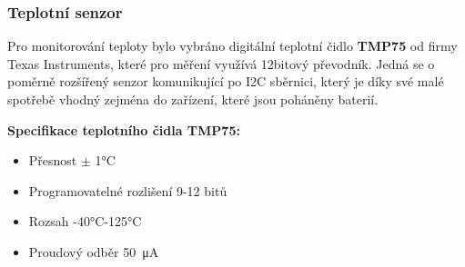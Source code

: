     


\subsubsection{Teplotní senzor}
    Pro monitorování teploty bylo vybráno digitální teplotní čidlo \textbf{TMP75} od firmy Texas Instruments, které pro měření využívá 12bitový převodník. Jedná se o poměrně rozšířený senzor komunikující po I2C sběrnici, který je díky své malé spotřebě vhodný zejména do zařízení, které jsou poháněny baterií.

    \textbf{Specifikace teplotního čidla TMP75:}
        \begin{itemize}
            \item Přesnost $\pm$ \ang{1}C
            \item Programovatelné rozlišení 9-12 bitů
            \item Rozsah \ang{-40}C-\ang{+125}C
            \item Proudový odběr \SI{50}{\micro\ampere}
        \end{itemize}
     
